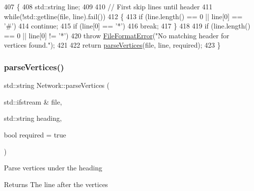 \begin{DoxyCode}
407 \{
408     std::string line;
409 
410     \textcolor{comment}{// First skip lines until header}
411     \textcolor{keywordflow}{while}(!std::getline(file, line).fail())
412     \{
413         \textcolor{keywordflow}{if} (line.length() == 0 || line[0] == \textcolor{charliteral}{'#'})
414             \textcolor{keywordflow}{continue};
415         \textcolor{keywordflow}{if} (line[0] == \textcolor{charliteral}{'*'})
416             \textcolor{keywordflow}{break};
417     \}
418 
419     \textcolor{keywordflow}{if} (line.length() == 0 || line[0] != \textcolor{charliteral}{'*'})
420         \textcolor{keywordflow}{throw} \mbox{\hyperlink{classFileFormatError}{FileFormatError}}(\textcolor{stringliteral}{"No matching header for vertices found."});
421 
422     \textcolor{keywordflow}{return} \mbox{\hyperlink{classNetwork_a57b99ecccedc6200838163fa3b1ad252}{parseVertices}}(file, line, required);
423 \}
\end{DoxyCode}
\mbox{\label{classNetwork_a5cec6b6daa66f112a70bc97c9c28fbc0}} 
\subsubsection{\texorpdfstring{parse\+Vertices()}{parseVertices()}\hspace{0.1cm}{\footnotesize\ttfamily [2/2]}}
{\footnotesize\ttfamily std\+::string Network\+::parse\+Vertices (\begin{DoxyParamCaption}\item[{std\+::ifstream \&}]{file,  }\item[{std\+::string}]{heading,  }\item[{bool}]{required = {\ttfamily true} }\end{DoxyParamCaption})\hspace{0.3cm}{\ttfamily [protected]}}

Parse vertices under the heading \begin{DoxyReturn}{Returns}
The line after the vertices 
\end{DoxyReturn}

